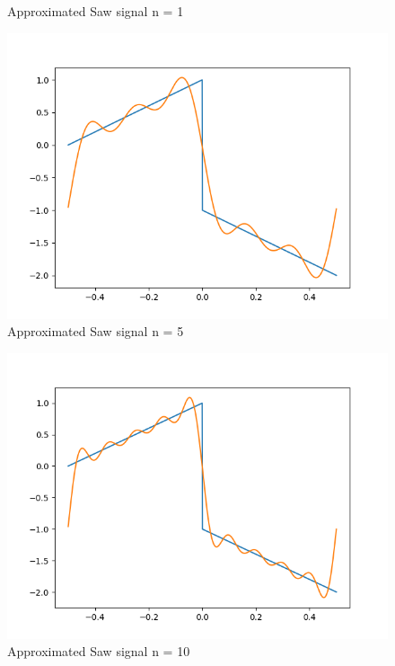 \documentclass[10pt,a4paper, margin=1in]{article}
\begin{document}
\begin{enumerate}
\begin{enumerate}
\begin{figure}[H]
            \caption{Approximated Saw signal n = 1}
        \end{figure}
        \begin{figure}[H]
            \includegraphics[scale=0.75]{approximatedSaw_n=5.png}
            \caption{Approximated Saw signal n = 5}
        \end{figure}
        \begin{figure}[H]
            \includegraphics[scale=0.75]{approximatedSaw_n=10.png}
            \caption{Approximated Saw signal n = 10}
        \end{figure}
        \begin{figure}[H]

\end{figure}
\end{enumerate}
\end{enumerate}
\end{document}
